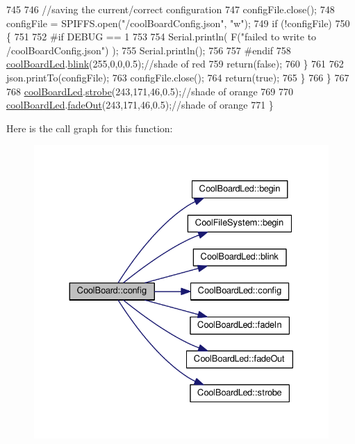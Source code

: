 \begin{DoxyCode}
745 
746             \textcolor{comment}{//saving the current/correct configuration}
747             configFile.close();
748             configFile = SPIFFS.open(\textcolor{stringliteral}{"/coolBoardConfig.json"}, \textcolor{stringliteral}{"w"});
749             \textcolor{keywordflow}{if} (!configFile)
750             \{
751             
752 \textcolor{preprocessor}{            #if DEBUG == 1}
753 
754                 Serial.println( F(\textcolor{stringliteral}{"failed to write to /coolBoardConfig.json"}) );
755                 Serial.println();
756             
757 \textcolor{preprocessor}{            #endif}
758                 \hyperlink{classCoolBoard_a1b1d3c684a5baa56b08486e192fd8e97}{coolBoardLed}.\hyperlink{classCoolBoardLed_a96e1ea13003eee34c9dbcef340404426}{blink}(255,0,0,0.5);\textcolor{comment}{//shade of red     }
759                 \textcolor{keywordflow}{return}(\textcolor{keyword}{false});
760             \}
761 
762             json.printTo(configFile);
763             configFile.close();
764             \textcolor{keywordflow}{return}(\textcolor{keyword}{true});
765         \}
766     \}
767 
768     \hyperlink{classCoolBoard_a1b1d3c684a5baa56b08486e192fd8e97}{coolBoardLed}.\hyperlink{classCoolBoardLed_ad5f0de4c628cbfbf49896042831c64ad}{strobe}(243,171,46,0.5);\textcolor{comment}{//shade of orange}
769     
770     \hyperlink{classCoolBoard_a1b1d3c684a5baa56b08486e192fd8e97}{coolBoardLed}.\hyperlink{classCoolBoardLed_a93d545679237e8cc858324367149775c}{fadeOut}(243,171,46,0.5);\textcolor{comment}{//shade of orange               }
771 \}
\end{DoxyCode}
Here is the call graph for this function\+:
\nopagebreak
\begin{figure}[H]
\begin{center}
\leavevmode
\includegraphics[width=330pt]{classCoolBoard_a583a874c09c07e70a6eb9229fc4beddb_cgraph}
\end{center}
\end{figure}
\mbox{\label{classCoolBoard_a519de78b807f8ec6463ff484eb925918}} 
